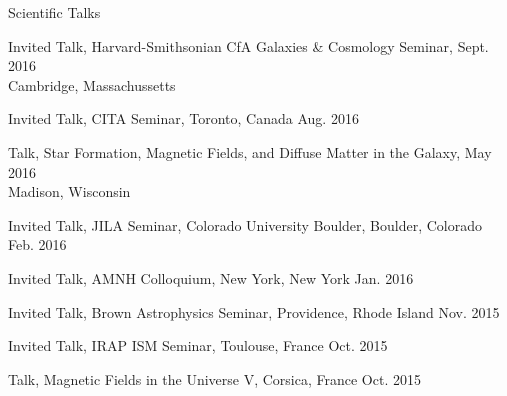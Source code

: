 \documentclass{resume_clark} %
\begin{document}
\begin{rSection}{Scientific Talks}
\begin{etaremune}[itemsep=-1.8mm]
\item Invited Talk, Harvard-Smithsonian CfA Galaxies \& Cosmology Seminar, \hfill{Sept. 2016}\\
Cambridge, Massachussetts

\item Invited Talk, CITA Seminar, Toronto, Canada \hfill {Aug. 2016}

\item Talk, Star Formation, Magnetic Fields, and Diffuse Matter in the Galaxy, \hfill{May 2016}\\
Madison, Wisconsin 

\item Invited Talk, JILA Seminar, Colorado University Boulder, Boulder, Colorado \hfill {Feb. 2016}

\item Invited Talk, AMNH Colloquium, New York, New York \hfill {Jan. 2016}

\item Invited Talk, Brown Astrophysics Seminar, Providence, Rhode Island \hfill {Nov. 2015}

\item Invited Talk, IRAP ISM Seminar, Toulouse, France \hfill{Oct. 2015}

\item Talk, Magnetic Fields in the Universe V, Corsica, France \hfill {Oct. 2015}


\end{etaremune}
\end{rSection}
\end{document}
